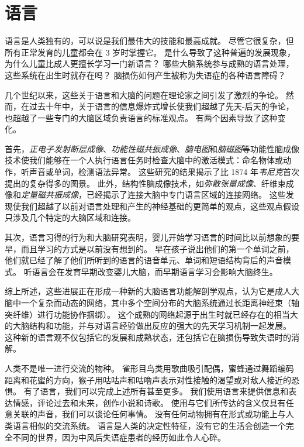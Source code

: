 \chapter{语言} \label{chap:chap55}

语言是人类独有的，可以说是我们最伟大的技能和最高成就。
尽管它很复杂，但所有正常发育的儿童都会在 3 岁时掌握它。
是什么导致了这种普遍的发展现象，为什么儿童比成人更擅长学习一门新语言？
哪些大脑系统参与成熟的语言处理，这些系统在出生时就存在吗？
脑损伤如何产生被称为失语症的各种语言障碍？


几个世纪以来，这些关于语言和大脑的问题在理论家之间引发了激烈的争论。
然而，在过去十年中，关于语言的信息爆炸式增长使我们超越了先天-后天的争论，也超越了一些专门的大脑区域负责语言的标准观点。
有两个因素导致了这种变化。


首先，\textit{正电子发射断层成像}、\textit{功能性磁共振成像}、\textit{脑电图}和\textit{脑磁图}等功能性脑成像技术使我们能够在一个人执行语言任务时检查大脑中的激活模式：命名物体或动作，听声音或单词，检测语法异常。
这些研究的结果揭示了比 1874 年\textit{韦尼克}首次提出的复杂得多的图景。
此外，结构性脑成像技术，如\textit{弥散张量成像}、纤维束成像和\textit{定量磁共振成像}，已经揭示了连接大脑中专门语言区域的连接网络。
这些发现使我们超越了以前对语言处理和产生的神经基础的更简单的观点，这些观点假设只涉及几个特定的大脑区域和连接。


其次，语言习得的行为和大脑研究表明，婴儿开始学习语言的时间比以前想象的要早，而且学习的方式是以前没有想到的。
早在孩子说出他们的第一个单词之前，他们就已经了解了他们所听到的语言的语音单元、单词和短语结构背后的声音模式。
听语言会在发育早期改变婴儿大脑，而早期语言学习会影响大脑终生。


综上所述，这些进展正在形成一种新的大脑语言功能解剖学观点，认为它是成人大脑中一个复杂而动态的网络，其中多个空间分布的大脑系统通过长距离神经束（轴突纤维）进行功能协作捆绑）。
这个成熟的网络起源于出生时就已经存在的相当大的大脑结构和功能，并与对语言经验做出反应的强大的先天学习机制一起发展。
这种新的语言观不仅包括它的发展和成熟状态，还包括它在脑损伤导致失语时的消解。


人类不是唯一进行交流的物种。
雀形目鸟类用歌曲吸引配偶，蜜蜂通过舞蹈编码距离和花蜜的方向，猴子用咕咕声和咕噜声表示对性接触的渴望或对敌人接近的恐惧。
有了语言，我们可以完成上述所有甚至更多。
我们使用语言来提供信息和表达情感，评论过去和未来，创作小说和诗歌。
使用与它们所传达的含义仅具有任意关联的声音，我们可以谈论任何事情。
没有任何动物拥有在形式或功能上与人类语言相似的交流系统。
语言是人类的决定性特征，没有它的生活会创造一个完全不同的世界，因为中风后失语症患者的经历如此令人心碎。




